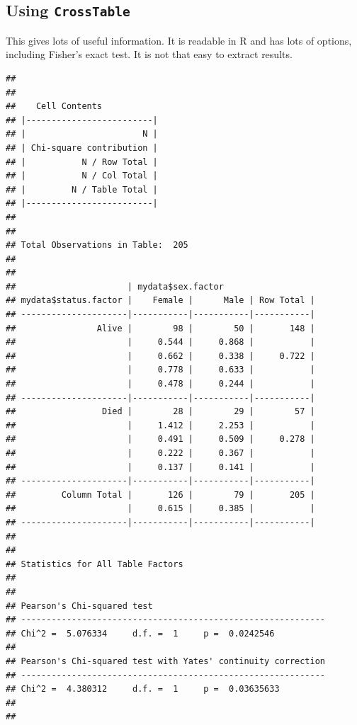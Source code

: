 \documentclass[]{book}
\makeatletter
\newenvironment{Shaded}{\begin{snugshade}}{\end{snugshade}}
\newcommand{\KeywordTok}[1]{\textcolor[rgb]{0.13,0.29,0.53}{\textbf{#1}}}
\newcommand{\DataTypeTok}[1]{\textcolor[rgb]{0.13,0.29,0.53}{#1}}
\newcommand{\CommentTok}[1]{\textcolor[rgb]{0.56,0.35,0.01}{\textit{#1}}}
\newcommand{\OtherTok}[1]{\textcolor[rgb]{0.56,0.35,0.01}{#1}}
\newcommand{\OperatorTok}[1]{\textcolor[rgb]{0.81,0.36,0.00}{\textbf{#1}}}
\newcommand{\NormalTok}[1]{#1}
\newenvironment{kframe}{%
\medskip{}
\setlength{\fboxsep}{.8em}
 \def\at@end@of@kframe{}%
 \ifinner\ifhmode%
  \def\at@end@of@kframe{\end{minipage}}%
  \begin{minipage}{\columnwidth}%
 \fi\fi%
 \def\FrameCommand##1{\hskip\@totalleftmargin \hskip-\fboxsep
 \colorbox{shadecolor}{##1}\hskip-\fboxsep
     \hskip-\linewidth \hskip-\@totalleftmargin \hskip\columnwidth}%
 \MakeFramed {\advance\hsize-\width
   \@totalleftmargin\z@ \linewidth\hsize
   \@setminipage}}%
 {\par\unskip\endMakeFramed%
 \at@end@of@kframe}
\renewenvironment{Shaded}{\begin{kframe}}{\end{kframe}}
\makeatother
\begin{document}
\subsection{\texorpdfstring{Using
\texttt{CrossTable}}{Using CrossTable}}\label{using-crosstable}

This gives lots of useful information. It is readable in R and has lots
of options, including Fisher's exact test. It is not that easy to
extract results. \newpage

\begin{Shaded}
\end{Shaded}

\begin{verbatim}
## 
##  
##    Cell Contents
## |-------------------------|
## |                       N |
## | Chi-square contribution |
## |           N / Row Total |
## |           N / Col Total |
## |         N / Table Total |
## |-------------------------|
## 
##  
## Total Observations in Table:  205 
## 
##  
##                      | mydata$sex.factor 
## mydata$status.factor |    Female |      Male | Row Total | 
## ---------------------|-----------|-----------|-----------|
##                Alive |        98 |        50 |       148 | 
##                      |     0.544 |     0.868 |           | 
##                      |     0.662 |     0.338 |     0.722 | 
##                      |     0.778 |     0.633 |           | 
##                      |     0.478 |     0.244 |           | 
## ---------------------|-----------|-----------|-----------|
##                 Died |        28 |        29 |        57 | 
##                      |     1.412 |     2.253 |           | 
##                      |     0.491 |     0.509 |     0.278 | 
##                      |     0.222 |     0.367 |           | 
##                      |     0.137 |     0.141 |           | 
## ---------------------|-----------|-----------|-----------|
##         Column Total |       126 |        79 |       205 | 
##                      |     0.615 |     0.385 |           | 
## ---------------------|-----------|-----------|-----------|
## 
##  
## Statistics for All Table Factors
## 
## 
## Pearson's Chi-squared test 
## ------------------------------------------------------------
## Chi^2 =  5.076334     d.f. =  1     p =  0.0242546 
## 
## Pearson's Chi-squared test with Yates' continuity correction 
## ------------------------------------------------------------
## Chi^2 =  4.380312     d.f. =  1     p =  0.03635633 
## 
## 
\end{verbatim}
\end{document}
